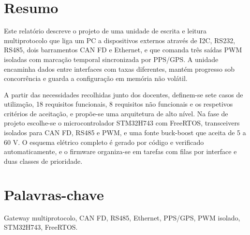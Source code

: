 \section*{Resumo}
Este relatório descreve o projeto de uma unidade de escrita e leitura
multiprotocolo que liga um PC a dispositivos externos através de I2C,
RS232, RS485, dois barramentos CAN FD e Ethernet, e que comanda três
saídas PWM isoladas com marcação temporal sincronizada por PPS/GPS. A
unidade encaminha dados entre interfaces com taxas diferentes, mantém
progresso sob concorrência e guarda a configuração em memória não
volátil.

A partir das necessidades recolhidas junto dos docentes, definem-se
sete casos de utilização, 18 requisitos funcionais, 8 requisitos não
funcionais e os respetivos critérios de aceitação, e propõe-se uma
arquitetura de alto nível. Na fase de projeto escolhe-se o
microcontrolador STM32H743 com FreeRTOS, transceivers isolados para CAN FD,
RS485 e PWM, e uma fonte buck-boost que aceita de 5 a 60 V. O esquema
elétrico completo é gerado por código e verificado automaticamente, e o
firmware organiza-se em tarefas com filas por interface e duas classes de
prioridade.

\section*{Palavras-chave}
Gateway multiprotocolo, CAN FD, RS485, Ethernet, PPS/GPS, PWM isolado,
STM32H743, FreeRTOS.
